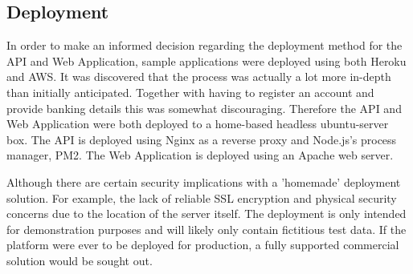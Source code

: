\subsection{Deployment}\label{deployment}
In order to make an informed decision regarding the deployment method for the API and Web Application, sample applications were deployed using both Heroku and AWS. It was discovered that the process was actually a lot more in-depth than initially anticipated. Together with having to register an account and provide banking details this was somewhat discouraging. Therefore the API and Web Application were both deployed to a home-based headless ubuntu-server box. The API is deployed using Nginx as a reverse proxy and Node.js's process manager, PM2. The Web Application is deployed using an Apache web server.

Although there are certain security implications with a 'homemade' deployment solution.  For example, the lack of reliable SSL encryption and physical security concerns due to the location of the server itself. The deployment is only intended for demonstration purposes and will likely only contain fictitious test data. If the platform were ever to be deployed for production, a fully supported commercial solution would be sought out.




